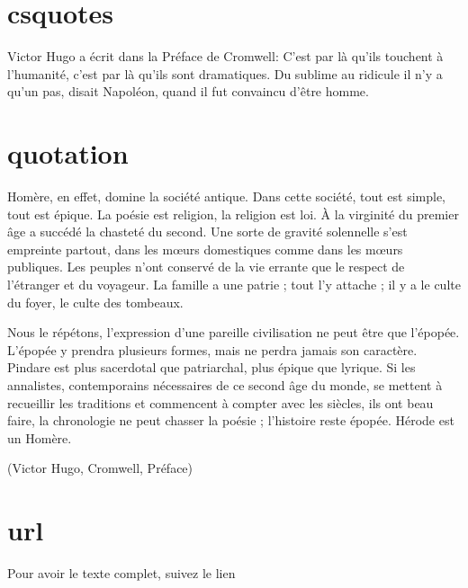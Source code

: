 \documentclass{article}
\begin{document}
\section{csquotes}

Victor Hugo a écrit dans la Préface de Cromwell: C’est par là qu’ils  touchent à l’humanité, c’est par là qu’ils sont dramatiques. Du sublime au ridicule il n’y a qu’un pas, disait Napoléon, quand il fut convaincu d’être homme.


\section{quotation}

Homère, en effet, domine la société antique. Dans cette société, tout est simple, tout est épique. La poésie est religion, la religion est loi. À la virginité du premier âge a succédé la chasteté du second. Une sorte de gravité solennelle s’est empreinte partout, dans les mœurs domestiques comme dans les mœurs publiques. Les peuples n’ont conservé de la vie errante que le respect de l’étranger et du voyageur. La famille a une patrie ; tout l’y attache ; il y a le culte du foyer, le culte des tombeaux.

Nous le répétons, l’expression d’une pareille civilisation ne peut être que l’épopée. L’épopée y prendra plusieurs formes, mais ne perdra jamais son caractère. Pindare est plus sacerdotal que patriarchal, plus épique que lyrique. Si les annalistes, contemporains nécessaires de ce second âge du monde, se mettent à recueillir les traditions et commencent à compter avec les siècles, ils ont beau faire, la chronologie ne peut chasser la poésie ; l’histoire reste épopée. Hérode est un Homère.

(Victor Hugo, Cromwell, Préface)

\section{url}
Pour avoir le texte complet, suivez le lien %

\end{document}
